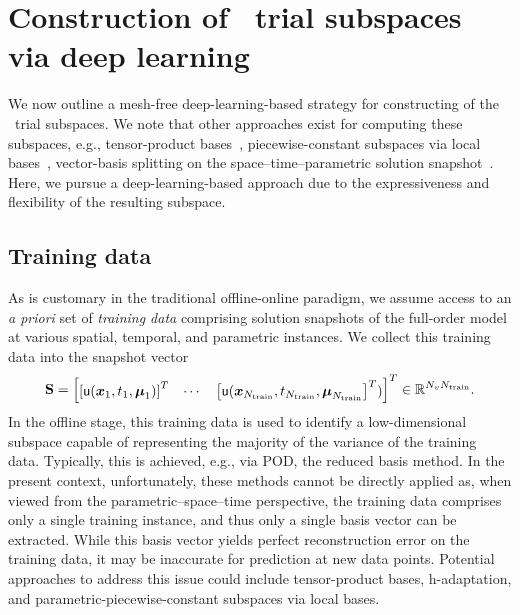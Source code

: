 \documentclass[3p,computermodern,10pt]{elsarticle}
\begin{document}
%
\section{Construction of \parametricSpaceTimeAcronym\ trial subspaces via deep learning}
We now outline a mesh-free deep-learning-based strategy for constructing of the \parametricSpaceTimeAcronym\ trial subspaces. We note that other approaches exist for computing these subspaces, e.g., tensor-product bases~\cite{choi_stlspg}, piecewise-constant subspaces via local bases~\cite{}, vector-basis splitting on the space--time--parametric solution snapshot~\cite{carlberg_hadaptation,ETTER2020112931}. Here, we pursue a deep-learning-based approach due to the expressiveness and flexibility of the resulting subspace.
\subsection{Training data}
As is customary in the traditional offline-online paradigm, we assume access to an \textit{a priori} set of \textit{training data} comprising solution snapshots of the full-order model at various spatial, temporal, and parametric instances. %
We collect this training data into the snapshot vector
$$\mathbf{S} = \begin{bmatrix} \left[\mathsf{u}(\boldsymbol x_1,t_1,\boldsymbol \mu_1)\right]^T & \cdots &  \left[\mathsf{u}(\boldsymbol x_{N_{\text{train}}},t_{N_{\text{train}}},\boldsymbol \mu_{N_{\text{train}}}\right]^T )\end{bmatrix}^T \in \mathbb{R}^{N_v  N_{\text{train}}}.$$ 
In the offline stage, this training data is used to identify a low-dimensional subspace capable of representing the majority of the variance of the training data. Typically, this is achieved, e.g., via POD, the reduced basis method. 
In the present context, unfortunately, these methods cannot be directly applied as, when viewed from the parametric--space--time perspective, the training data comprises only a single training instance, and thus only a single basis vector can be extracted. While this basis vector yields perfect reconstruction error on the training data, it may be inaccurate for prediction at new data points. Potential approaches to address this issue could include tensor-product bases, h-adaptation, and parametric-piecewise-constant subspaces via local bases. 
\end{document}
